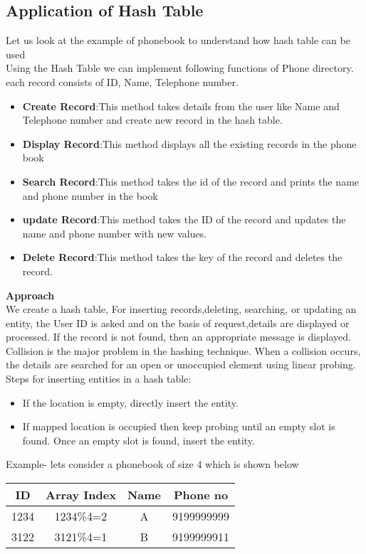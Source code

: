 \documentclass[journal,12pt,twocolumn]{IEEEtran}
\begin{document}
\subsection{\textbf{Application of Hash Table}}
Let us look at the example of phonebook to understand how hash table can be used\\
Using the Hash Table we can implement following functions of Phone directory.
each record consists of ID, Name, Telephone number.
\begin{itemize}
\item \textbf{Create Record}:This method takes details from the user like Name and Telephone number and create new record in the hash table.
\item \textbf{Display Record}:This method displays all the existing records in the phone book
\item \textbf{Search Record}:This method takes the id of the record and prints the name and phone number in the book
\item \textbf{update Record}:This method takes the ID of the record and updates the name and phone number with new values.
\item \textbf{Delete Record}:This method takes the key of the record and deletes the record.
\end{itemize}
\pagebreak
\textbf{Approach}
\\
We  create a hash table, For inserting records,deleting, searching, or updating an entity, the User ID is asked and on the basis of request,details are displayed or processed. If the record is not found, then an appropriate message is displayed.\\
Collision is the major problem in the hashing technique.
When a collision occurs, the details are searched for an open or unoccupied element using linear probing.
Steps for inserting entities in a hash table:
\begin{itemize}
\item If the location is empty, directly insert the entity.
\item If mapped location is occupied then keep probing until an empty slot is found. Once an empty slot is found, insert the entity.
\end{itemize}
Example- lets consider a phonebook of size 4 which is shown below\\
\begin{center}
\begin{tabular}{ |c|c|c|c| } 
 \hline
ID&Array Index&Name&Phone no\\
\hline 
1234&1234\%4=2&A&9199999999\\
3122&3121\%4=1&B&9199999911\\
 \hline
\end{tabular}
\end{center}
\end{document}
